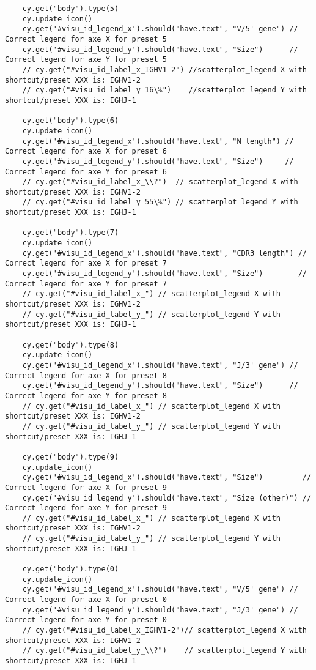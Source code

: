 \begin{verbatim}
    cy.get("body").type(5)
    cy.update_icon()
    cy.get('#visu_id_legend_x').should("have.text", "V/5' gene") // Correct legend for axe X for preset 5
    cy.get('#visu_id_legend_y').should("have.text", "Size")      // Correct legend for axe Y for preset 5
    // cy.get("#visu_id_label_x_IGHV1-2") //scatterplot_legend X with shortcut/preset XXX is: IGHV1-2
    // cy.get("#visu_id_label_y_16\%")    //scatterplot_legend Y with shortcut/preset XXX is: IGHJ-1

    cy.get("body").type(6)
    cy.update_icon()
    cy.get('#visu_id_legend_x').should("have.text", "N length") // Correct legend for axe X for preset 6
    cy.get('#visu_id_legend_y').should("have.text", "Size")     // Correct legend for axe Y for preset 6
    // cy.get("#visu_id_label_x_\\?")  // scatterplot_legend X with shortcut/preset XXX is: IGHV1-2
    // cy.get("#visu_id_label_y_55\%") // scatterplot_legend Y with shortcut/preset XXX is: IGHJ-1

    cy.get("body").type(7)
    cy.update_icon()
    cy.get('#visu_id_legend_x').should("have.text", "CDR3 length") // Correct legend for axe X for preset 7
    cy.get('#visu_id_legend_y').should("have.text", "Size")        // Correct legend for axe Y for preset 7
    // cy.get("#visu_id_label_x_") // scatterplot_legend X with shortcut/preset XXX is: IGHV1-2
    // cy.get("#visu_id_label_y_") // scatterplot_legend Y with shortcut/preset XXX is: IGHJ-1

    cy.get("body").type(8)
    cy.update_icon()
    cy.get('#visu_id_legend_x').should("have.text", "J/3' gene") // Correct legend for axe X for preset 8
    cy.get('#visu_id_legend_y').should("have.text", "Size")      // Correct legend for axe Y for preset 8
    // cy.get("#visu_id_label_x_") // scatterplot_legend X with shortcut/preset XXX is: IGHV1-2
    // cy.get("#visu_id_label_y_") // scatterplot_legend Y with shortcut/preset XXX is: IGHJ-1

    cy.get("body").type(9)
    cy.update_icon()
    cy.get('#visu_id_legend_x').should("have.text", "Size")         // Correct legend for axe X for preset 9
    cy.get('#visu_id_legend_y').should("have.text", "Size (other)") // Correct legend for axe Y for preset 9
    // cy.get("#visu_id_label_x_") // scatterplot_legend X with shortcut/preset XXX is: IGHV1-2
    // cy.get("#visu_id_label_y_") // scatterplot_legend Y with shortcut/preset XXX is: IGHJ-1

    cy.get("body").type(0)
    cy.update_icon()
    cy.get('#visu_id_legend_x').should("have.text", "V/5' gene") // Correct legend for axe X for preset 0
    cy.get('#visu_id_legend_y').should("have.text", "J/3' gene") // Correct legend for axe Y for preset 0
    // cy.get("#visu_id_label_x_IGHV1-2")// scatterplot_legend X with shortcut/preset XXX is: IGHV1-2
    // cy.get("#visu_id_label_y_\\?")    // scatterplot_legend Y with shortcut/preset XXX is: IGHJ-1

\end{verbatim}

